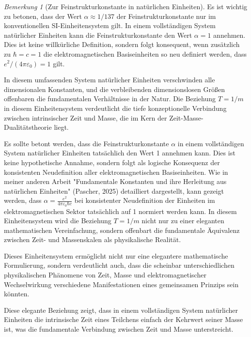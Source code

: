 \documentclass{article}
\theoremstyle{definition}
\theoremstyle{remark}
\newtheorem{remark}[theorem]{Bemerkung}
\begin{document}
		\begin{remark}[Zur Feinstrukturkonstante in natürlichen Einheiten]
			Es ist wichtig zu betonen, dass der Wert $\alpha \approx 1/137$ der Feinstrukturkonstante nur im konventionellen SI-Einheitensystem gilt. In einem vollständigen System natürlicher Einheiten kann die Feinstrukturkonstante den Wert $\alpha = 1$ annehmen. Dies ist keine willkürliche Definition, sondern folgt konsequent, wenn zusätzlich zu $\hbar = c = 1$ die elektromagnetischen Basiseinheiten so neu definiert werden, dass $e^2/(4\pi\varepsilon_0) = 1$ gilt. 
			
			In diesem umfassenden System natürlicher Einheiten verschwinden alle dimensionalen Konstanten, und die verbleibenden dimensionslosen Größen offenbaren die fundamentalen Verhältnisse in der Natur. Die Beziehung $T = 1/m$ in diesem Einheitensystem verdeutlicht die tiefe konzeptionelle Verbindung zwischen intrinsischer Zeit und Masse, die im Kern der Zeit-Masse-Dualitätstheorie liegt.
			
			Es sollte betont werden, dass die Feinstrukturkonstante $\alpha$ in einem vollständigen System natürlicher Einheiten tatsächlich den Wert 1 annehmen kann. Dies ist keine hypothetische Annahme, sondern folgt als logische Konsequenz der konsistenten Neudefinition aller elektromagnetischen Basiseinheiten. Wie in meiner anderen Arbeit "Fundamentale Konstanten und ihre Herleitung aus natürlichen Einheiten" (Pascher, 2025) detailliert dargestellt, kann gezeigt werden, dass $\alpha = \frac{e^2}{4\pi\varepsilon_0\hbar c}$ bei konsistenter Neudefinition der Einheiten im elektromagnetischen Sektor tatsächlich auf 1 normiert werden kann. In diesem Einheitensystem wird die Beziehung $T = 1/m$ nicht nur zu einer eleganten mathematischen Vereinfachung, sondern offenbart die fundamentale Äquivalenz zwischen Zeit- und Massenskalen als physikalische Realität.
			
			Dieses Einheitensystem ermöglicht nicht nur eine elegantere mathematische Formulierung, sondern verdeutlicht auch, dass die scheinbar unterschiedlichen physikalischen Phänomene von Zeit, Masse und elektromagnetischer Wechselwirkung verschiedene Manifestationen eines gemeinsamen Prinzips sein könnten.
		\end{remark}
		
		Diese elegante Beziehung zeigt, dass in einem vollständigen System natürlicher Einheiten die intrinsische Zeit eines Teilchens einfach der Kehrwert seiner Masse ist, was die fundamentale Verbindung zwischen Zeit und Masse unterstreicht.
		
\end{document}

